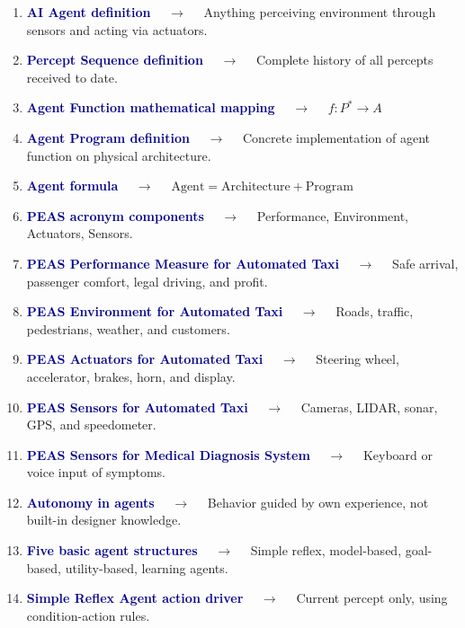 \documentclass[11pt,a4paper]{article}
\begin{document}
\begin{enumerate}[label=\arabic*., leftmargin=*, labelsep=0.8em, itemsep=0.35em, parsep=0.1em, topsep=0.2em]
  \item \textcolor{darkblue}{\textbf{AI Agent definition}} $\quad\to\quad$ Anything perceiving environment through sensors and acting via actuators.
  \item \textcolor{darkblue}{\textbf{Percept Sequence definition}} $\quad\to\quad$ Complete history of all percepts received to date.
  \item \textcolor{darkblue}{\textbf{Agent Function mathematical mapping}} $\quad\to\quad$ $f: P^* \rightarrow A$
  \item \textcolor{darkblue}{\textbf{Agent Program definition}} $\quad\to\quad$ Concrete implementation of agent function on physical architecture.
  \item \textcolor{darkblue}{\textbf{Agent formula}} $\quad\to\quad$ $\text{Agent} = \text{Architecture} + \text{Program}$
  \item \textcolor{darkblue}{\textbf{PEAS acronym components}} $\quad\to\quad$ Performance, Environment, Actuators, Sensors.
  \item \textcolor{darkblue}{\textbf{PEAS Performance Measure for Automated Taxi}} $\quad\to\quad$ Safe arrival, passenger comfort, legal driving, and profit.
  \item \textcolor{darkblue}{\textbf{PEAS Environment for Automated Taxi}} $\quad\to\quad$ Roads, traffic, pedestrians, weather, and customers.
  \item \textcolor{darkblue}{\textbf{PEAS Actuators for Automated Taxi}} $\quad\to\quad$ Steering wheel, accelerator, brakes, horn, and display.
  \item \textcolor{darkblue}{\textbf{PEAS Sensors for Automated Taxi}} $\quad\to\quad$ Cameras, LIDAR, sonar, GPS, and speedometer.
  \item \textcolor{darkblue}{\textbf{PEAS Sensors for Medical Diagnosis System}} $\quad\to\quad$ Keyboard or voice input of symptoms.
  \item \textcolor{darkblue}{\textbf{Autonomy in agents}} $\quad\to\quad$ Behavior guided by own experience, not built-in designer knowledge.
  \item \textcolor{darkblue}{\textbf{Five basic agent structures}} $\quad\to\quad$ Simple reflex, model-based, goal-based, utility-based, learning agents.
  \item \textcolor{darkblue}{\textbf{Simple Reflex Agent action driver}} $\quad\to\quad$ Current percept only, using condition-action rules.

\end{enumerate}
\end{document}
